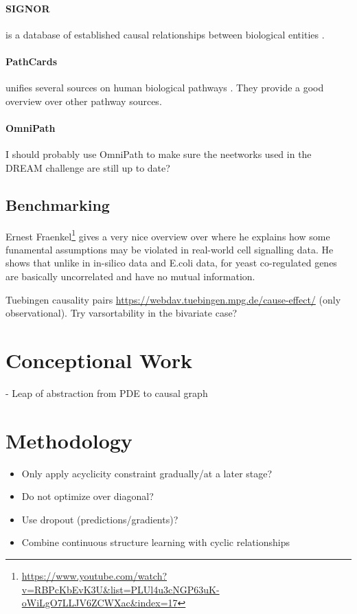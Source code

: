 \documentclass{article}
\begin{document}
\paragraph{SIGNOR} is a database of established causal relationships between biological entities \cite{perfetto2016signor}.

\paragraph{PathCards} unifies several sources on human biological pathways \cite{belinky2015pathcards}.
They provide a good overview over other pathway sources.

\paragraph{OmniPath} I should probably use OmniPath to make sure the neetworks used in the DREAM challenge are still up to date?

\subsection{Benchmarking}

Ernest Fraenkel\footnote{\url{https://www.youtube.com/watch?v=RBPcKbEvK3U&list=PLUl4u3cNGP63uK-oWiLgO7LLJV6ZCWXac&index=17}} gives a very nice overview over \cite{marbach2012wisdom} where he explains how some funamental assumptions may be violated in real-world cell signalling data.
He shows that unlike in in-silico data and E.coli data, for yeast co-regulated genes are basically uncorrelated and have no mutual information.

Tuebingen causality pairs \url{https://webdav.tuebingen.mpg.de/cause-effect/} (only observational).
Try varsortability in the bivariate case?


\section{Conceptional Work}
    - Leap of abstraction from PDE to causal graph

\section{Methodology}
\begin{itemize}
    \item Only apply acyclicity constraint gradually/at a later stage?
    \item Do not optimize over diagonal?
    \item Use dropout (predictions/gradients)?
    \item Combine continuous structure learning with cyclic relationships
\end{itemize}
\end{document}
